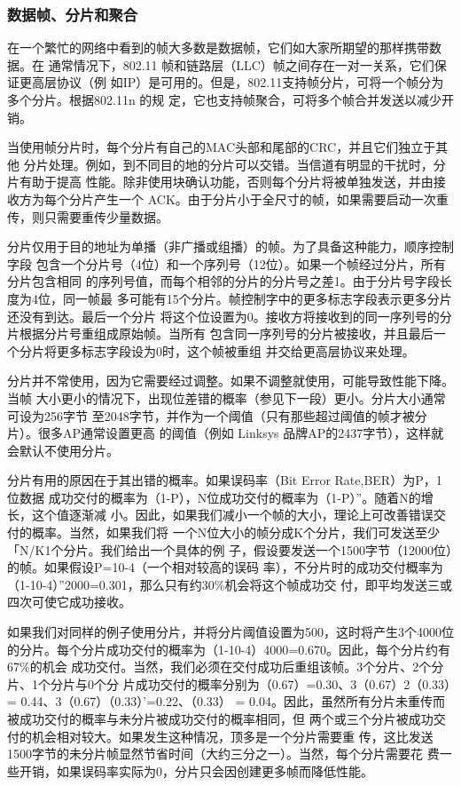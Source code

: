 \subsubsection{数据帧、分片和聚合}

在一个繁忙的网络中看到的帧大多数是数据帧，它们如大家所期望的那样携带数据。在
通常情况下，802.11 帧和链路层（LLC）帧之间存在一对一关系，它们保证更高层协议（例
如IP）是可用的。但是，802.11支持帧分片，可将一个帧分为多个分片。根据802.11n 的规
定，它也支持帧聚合，可将多个帧合并发送以减少开销。

当使用帧分片时，每个分片有自己的MAC头部和尾部的CRC，并且它们独立于其他
分片处理。例如，到不同目的地的分片可以交错。当信道有明显的干扰时，分片有助于提高
性能。除非使用块确认功能，否则每个分片将被单独发送，并由接收方为每个分片产生一个
ACK。由于分片小于全尺寸的帧，如果需要启动一次重传，则只需要重传少量数据。

分片仅用于目的地址为单播（非广播或组播）的帧。为了具备这种能力，顺序控制字段
包含一个分片号（4位）和一个序列号（12位）。如果一个帧经过分片，所有分片包含相同
的序列号值，而每个相邻的分片的分片号之差1。由于分片号字段长度为4位，同一帧最
多可能有15个分片。帧控制字中的更多标志字段表示更多分片还没有到达。最后一个分片
将这个位设置为0。接收方将接收到的同一序列号的分片根据分片号重组成原始帧。当所有
包含同一序列号的分片被接收，并且最后一个分片将更多标志字段设为0时，这个帧被重组
并交给更高层协议来处理。

分片并不常使用，因为它需要经过调整。如果不调整就使用，可能导致性能下降。当帧
大小更小的情况下，出现位差错的概率（参见下一段）更小。分片大小通常可设为256字节
至2048字节，并作为一个阈值（只有那些超过阈值的帧才被分片）。很多AP通常设置更高
的阈值（例如 Linksys 品牌AP的2437字节），这样就会默认不使用分片。

分片有用的原因在于其出错的概率。如果误码率（Bit Error Rate,BER）为P，1 位数据
成功交付的概率为（1-P），N位成功交付的概率为（1-P）”。随着N的增长，这个值逐渐减
小。因此，如果我们减小一个帧的大小，理论上可改善错误交付的概率。当然，如果我们将
一个N位大小的帧分成K个分片，我们可发送至少「N/K1个分片。我们给出一个具体的例
子，假设要发送一个1500字节（12000位）的帧。如果假设P=10-4（一个相对较高的误码
率），不分片时的成功交付概率为（1-10-4）”2000=0.301，那么只有约30\%机会将这个帧成功交
付，即平均发送三或四次可使它成功接收。

如果我们对同样的例子使用分片，并将分片阈值设置为500，这时将产生3个4000位
的分片。每个分片成功交付的概率为（1-10-4）4000=0.670。因此，每个分片约有67\%的机会
成功交付。当然，我们必须在交付成功后重组该帧。3个分片、2个分片、1个分片与0个分
片成功交付的概率分别为（0.67）=0.30、3（0.67）2（0.33）= 0.44、3（0.67）（0.33）’=0.22、（0.33） =
0.04。因此，虽然所有分片未重传而被成功交付的概率与未分片被成功交付的概率相同，但
两个或三个分片被成功交付的机会相对较大。如果发生这种情况，顶多是一个分片需要重
传，这比发送1500字节的未分片帧显然节省时间（大约三分之一）。当然，每个分片需要花
费一些开销，如果误码率实际为0，分片只会因创建更多帧而降低性能。

